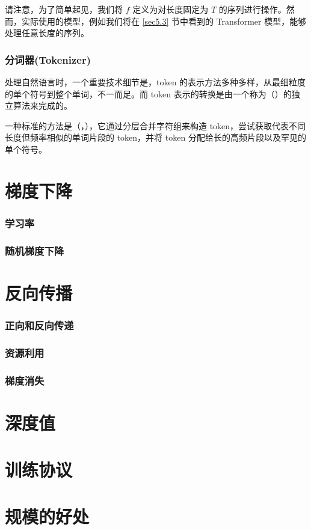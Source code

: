 请注意，为了简单起见，我们将 $f$ 定义为对长度固定为 $T$ 的序列进行操作。然而，实际使用的模型，例如我们将在 \ref{sec5.3} 节中看到的 Transformer 模型，能够处理任意长度的序列。

\subsubsection*{分词器(Tokenizer)}

处理自然语言时，一个重要技术细节是，token 的表示方法多种多样，从最细粒度的单个符号到整个单词，不一而足。而 token 表示的转换是由一个称为（）的独立算法来完成的。

一种标准的方法是（，）\cite{srivastava14a}，它通过分层合并字符组来构造 token，尝试获取代表不同长度但频率相似的单词片段的 token，并将 token 分配给长的高频片段以及罕见的单个符号。

\section{梯度下降}\label{sec3.3}

\subsubsection*{学习率}

\subsubsection*{随机梯度下降}

\section{反向传播}

\subsubsection*{正向和反向传递}

\subsubsection*{资源利用}

\subsubsection*{梯度消失}

\section{深度值}\label{sec3.6}

\section{训练协议}\label{sec3.7}

\section{规模的好处}